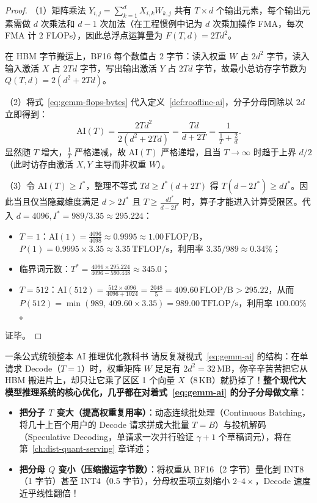 \begin{proof}
（1）矩阵乘法 $Y_{i,j} = \sum_{k=1}^{d} X_{i,k} W_{k,j}$ 共有 $T \times d$ 个输出元素，每个输出元素需做 $d$ 次乘法和 $d - 1$ 次加法（在工程惯例中记为 $d$ 次乘加操作 FMA，每次 FMA 计 $2$ FLOPs），因此总浮点运算量为 $F(T, d) = 2 T d^2$。

在 HBM 字节搬运上，BF16 每个数值占 $2$ 字节：读入权重 $W$ 占 $2 d^2$ 字节，读入输入激活 $X$ 占 $2 T d$ 字节，写出输出激活 $Y$ 占 $2 T d$ 字节，故最小总访存字节数为 $Q(T, d) = 2(d^2 + 2 T d)$。

（2）将式~\eqref{eq:gemm-flops-bytes} 代入定义~\ref{def:roofline-ai}，分子分母同除以 $2d$ 立即得到：
\[
  \mathrm{AI}(T) = \frac{2 T d^2}{2(d^2 + 2 T d)} = \frac{T d}{d + 2 T} = \frac{1}{\frac{1}{T} + \frac{2}{d}}.
\]
显然随 $T$ 增大，$\frac{1}{T}$ 严格递减，故 $\mathrm{AI}(T)$ 严格递增，且当 $T \to \infty$ 时趋于上界 $d / 2$（此时访存由激活 $X, Y$ 主导而非权重 $W$）。

（3）令 $\mathrm{AI}(T) \ge I^*$，整理不等式 $T d \ge I^*(d + 2 T)$ 得 $T(d - 2 I^*) \ge d I^*$。因此当且仅当隐藏维度满足 $d > 2 I^*$ 且 $T \ge \frac{d I^*}{d - 2 I^*}$ 时，算子才能进入计算受限区。代入 $d = 4096, I^* = 989/3.35 \approx 295.224$：
\begin{itemize}
  \item $T = 1$：$\mathrm{AI}(1) = \frac{4096}{4098} \approx 0.9995 \approx 1.00\,\mathrm{FLOP/B}$，$P(1) = 0.9995 \times 3.35 \approx 3.35\,\mathrm{TFLOP/s}$，利用率 $3.35 / 989 \approx 0.34\%$；
  \item 临界词元数：$T^* = \frac{4096 \times 295.224}{4096 - 590.448} \approx 345.0$；
  \item $T = 512$：$\mathrm{AI}(512) = \frac{512 \times 4096}{4096 + 1024} = \frac{2048}{5} = 409.60\,\mathrm{FLOP/B} > 295.22$，从而 $P(512) = \min(989,\, 409.60 \times 3.35) = 989.00\,\mathrm{TFLOP/s}$，利用率 $100.00\%$。
\end{itemize}
证毕。
\end{proof}

\begin{insightBox}{一条公式统领整本 AI 推理优化教科书}
请反复凝视式~\eqref{eq:gemm-ai} 的结构：在单请求 Decode（$T=1$）时，权重矩阵 $W$ 足足有 $2d^2 = 32\,\mathrm{MB}$，你辛辛苦苦把它从 HBM 搬进片上，却只让它乘了区区 1 个向量 $X$（$8\,\mathrm{KB}$）就扔掉了！\textbf{整个现代大模型推理系统的核心优化，几乎都在对着式~\eqref{eq:gemm-ai} 的分子分母做文章}：
\begin{itemize}
  \item \textbf{把分子 $T$ 变大（提高权重复用率）}：动态连续批处理（Continuous Batching，将几十上百个用户的 Decode 请求拼成大批量 $T = B$）与投机解码（Speculative Decoding，单请求一次并行验证 $\gamma + 1$ 个草稿词元），将在第~\ref{ch:dist-quant-serving} 章详述；
  \item \textbf{把分母 $Q$ 变小（压缩搬运字节数）}：将权重从 BF16（2 字节）量化到 INT8（1 字节）甚至 INT4（0.5 字节），分母权重项立刻缩小 $2\text{--}4\times$，Decode 速度近乎线性翻倍！
\end{itemize}
\end{insightBox}

